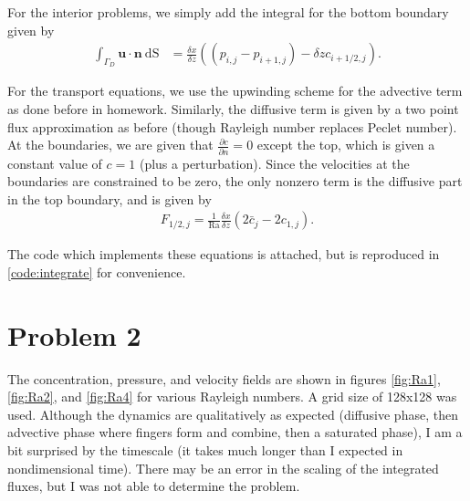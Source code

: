 \documentclass{article}
\begin{document}
For the interior problems, we simply add the integral for the bottom boundary given by
\begin{align}
\int_{\Gamma_{D}} \mathbf{u} \cdot \mathbf{n}\ \mathrm{dS} &= \frac{\delta x}{\delta z} \left( (p_{i,j} - p_{i+1,j}) - \delta z c_{i+1/2,j} \right).
\end{align}

For the transport equations, we use the upwinding scheme for the advective term as done before in homework.
Similarly, the diffusive term is given by a two point flux approximation as before (though Rayleigh number replaces Peclet number).
At the boundaries, we are given that $\frac{\partial c}{\partial n} = 0$ except the top, which is given a constant value of $c = 1$ (plus a perturbation).
Since the velocities at the boundaries are constrained to be zero, the only nonzero term is the diffusive part in the top boundary, and is given by
\begin{align}
F_{1/2, j} = \frac{1}{\mathrm{Ra}} \frac{\delta x} {\delta z} \left( 2 \bar{c}_{j} - 2 c_{1, j} \right).
\end{align}

The code which implements these equations is attached, but is reproduced in \cref{code:integrate} for convenience.

\section{Problem 2}
The concentration, pressure, and velocity fields are shown in figures \ref{fig:Ra1}, \ref{fig:Ra2}, and \ref{fig:Ra4} for various Rayleigh numbers. A grid size of 128x128 was used.
Although the dynamics are qualitatively as expected (diffusive phase, then advective phase where fingers form and combine, then a saturated phase), I am a bit surprised by the timescale (it takes much longer than I expected in nondimensional time).
There may be an error in the scaling of the integrated fluxes, but I was not able to determine the problem.
\end{document}
